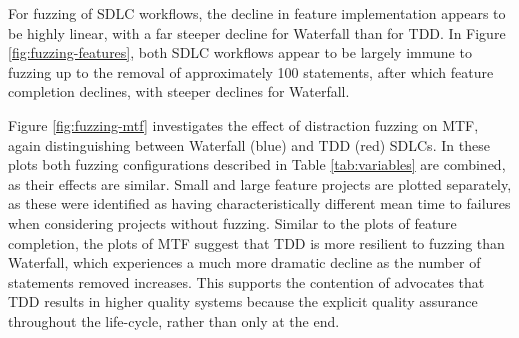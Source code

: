 \documentclass{llncs}
\begin{document}
For fuzzing of SDLC workflows, the decline in feature implementation appears to be highly linear, with a far steeper
decline for Waterfall than for TDD.  In Figure \ref{fig:fuzzing-features}, both SDLC workflows appear to be largely
immune to fuzzing up to the removal of approximately 100 statements, after which feature completion declines, with
steeper declines for Waterfall.

Figure \ref{fig:fuzzing-mtf} investigates the effect of distraction fuzzing on MTF, again distinguishing between
Waterfall (blue) and TDD (red) SDLCs.  In these plots both fuzzing configurations described in Table \ref{tab:variables}
are combined, as their effects are similar.  Small and large feature projects are plotted separately, as these were
identified as having characteristically different mean time to failures when considering projects without fuzzing.
Similar to the plots of feature completion, the plots of MTF suggest that TDD is more resilient to fuzzing than
Waterfall, which experiences a much more dramatic decline as the number of statements removed increases.  This supports
the contention of advocates that TDD results in higher quality systems because the explicit quality assurance throughout
the life-cycle, rather than only at the end.
\end{document}
